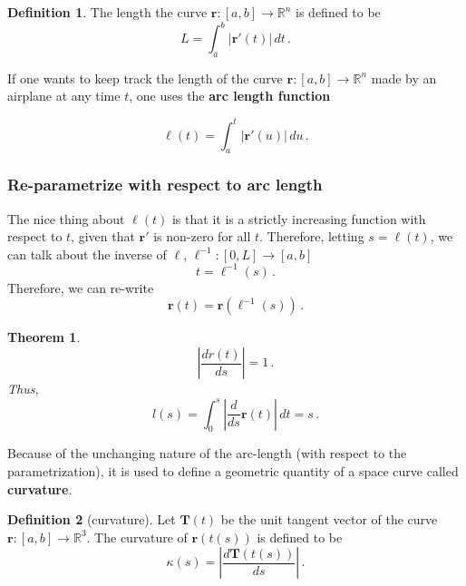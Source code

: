 \documentclass[
]{book}
\newtheorem{theorem}{Theorem}[chapter]
\theoremstyle{definition}
\newtheorem{definition}{Definition}[chapter]
\theoremstyle{definition}
\theoremstyle{definition}
\theoremstyle{definition}
\theoremstyle{remark}
\begin{document}
\begin{definition}
The length the curve \(\mathbf{r}:[a,b] \to \mathbb{R}^n\) is defined to be
\begin{equation*}
L = \int_a^b \left| \mathbf{r}'(t) \right| \, dt \,.
\end{equation*}
\end{definition}

If one wants to keep track the length of the curve \(\mathbf{r}:[a,b] \to \mathbb{R}^n\) made by an airplane
at any time \(t\), one uses the \textbf{arc length function}

\begin{equation*}
    \ell(t) = \int_a^t \left| \mathbf{r}'(u) \right| \, du \,.
\end{equation*}

\subsubsection*{Re-parametrize with respect to arc length}\label{re-parametrize-with-respect-to-arc-length}


The nice thing about \(\ell(t)\) is that it is a strictly increasing function with respect to \(t\),
given that \(\mathbf{r}'\) is non-zero for all \(t\).
Therefore, letting \(s = \ell(t)\), we can talk about the inverse of \(\ell\), \(\ell^{-1}:[0,L] \to [a,b]\)
\begin{equation*}
    t = \ell^{-1}(s) \,.
\end{equation*}
Therefore, we can re-write
\begin{equation*}
\mathbf{r}(t) = \mathbf{r}(\ell^{-1}(s)) \,.
\end{equation*}

\begin{theorem}
\[\left| \frac{d r(t)}{ds} \right| = 1 \,.\]
Thus,
\[l(s) = \int_0^s \left| \frac{d}{ds} \mathbf{r}(t) \right| \, dt = s \,.\]
\end{theorem}

Because of the unchanging nature of the arc-length (with respect to the
parametrization),
it is used to define a geometric quantity of a space curve called \textbf{curvature}.

\begin{definition}[curvature]
Let \(\mathbf{T}(t)\) be the unit tangent vector of the curve \(\mathbf{r}:[a,b] \to \mathbb{R}^3\).
The curvature of \(\mathbf{r}(t(s))\) is defined to be
\begin{equation*}
    \kappa(s) = \left| \frac{d \mathbf{T}(t(s))}{ds}\right| \,.
\end{equation*}
\end{definition}
\end{document}
